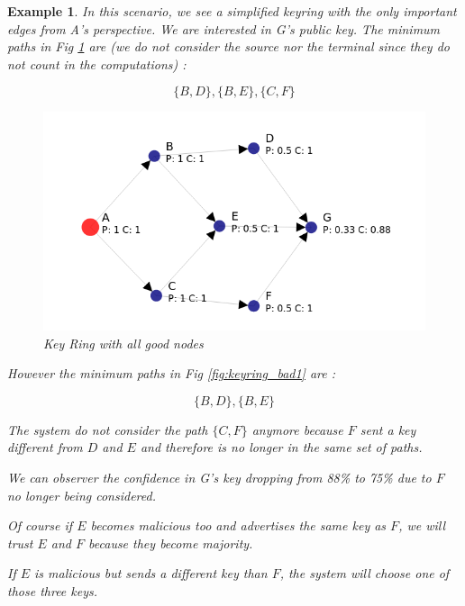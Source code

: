 \documentclass[]{article}
\newtheorem{exmp}{Example}[section]
\begin{document}
\begin{exmp}
	
	In this scenario, we see a simplified keyring with the only important edges from A's perspective. We are interested in G's public key.
	The minimum paths in Fig \ref{fig:keyring_good1} are (we do not consider the source nor the terminal since they do not count in the computations) :
	
	\[ { \{B,D\}, \{B,E\}, \{C,F\}  } \]

	\begin{figure}[h]
		\includegraphics[width=\textwidth,height=\textheight,keepaspectratio]{keyring-good1}
		\centering
		\caption{Key Ring with all good nodes}
		\label{fig:keyring_good1}
	\end{figure}
	
	However the minimum paths in Fig \ref{fig:keyring_bad1} are :
	
		\[ { \{B,D\}, \{B,E\}  } \]
		
	
	The system do not consider the path $\{C,F\}$ anymore because $F$ sent a key different from $D$ and $E$ and therefore is no longer in the same set of paths.
	
	We can observer the confidence in G's key dropping from 88\% to 75\% due to $F$ no longer being considered.	
	
	Of course if $E$ becomes malicious too and advertises the same key as $F$, we will trust $E$ and $F$ because they become majority.
	
	If $E$ is malicious but sends a different key than $F$, the system will choose one of those three keys.
	

\end{exmp}
\end{document}
